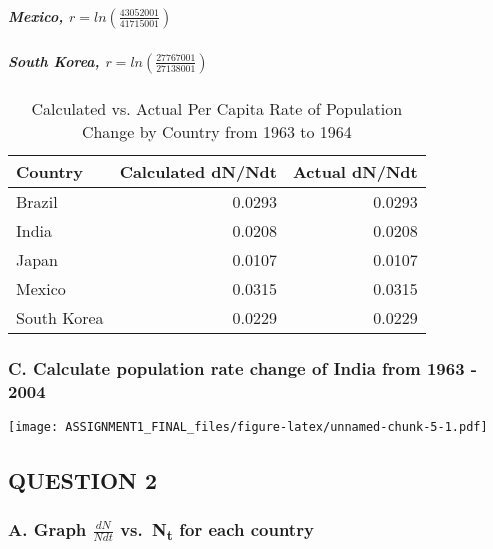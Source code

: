 \documentclass[]{article}
\let\oldsubparagraph\subparagraph
\renewcommand{\subparagraph}[1]{\oldsubparagraph{#1}\mbox{}}
\begin{document}
\subparagraph{\texorpdfstring{Mexico,
\(r= ln\left(\frac{43052001}{41715001}\right)\)}{Mexico, r= ln\textbackslash{}left(\textbackslash{}frac\{43052001\}\{41715001\}\textbackslash{}right)}}\label{mexico-r-lnleftfrac4305200141715001right}

\subparagraph{\texorpdfstring{South Korea,
\(r= ln\left(\frac{27767001}{27138001}\right)\)}{South Korea, r= ln\textbackslash{}left(\textbackslash{}frac\{27767001\}\{27138001\}\textbackslash{}right)}}\label{south-korea-r-lnleftfrac2776700127138001right}

\begin{table}

\caption{\label{tab:unnamed-chunk-4}Calculated vs. Actual Per Capita Rate of Population Change by Country from 1963 to 1964}
\centering
\begin{tabular}[t]{l|r|r}
\hline
Country & Calculated dN/Ndt & Actual dN/Ndt\\
\hline
Brazil & 0.0293 & 0.0293\\
\hline
India & 0.0208 & 0.0208\\
\hline
Japan & 0.0107 & 0.0107\\
\hline
Mexico & 0.0315 & 0.0315\\
\hline
South Korea & 0.0229 & 0.0229\\
\hline
\end{tabular}
\end{table}

\subsubsection{C. Calculate population rate change of India from 1963 -
2004}\label{c.-calculate-population-rate-change-of-india-from-1963---2004}

\texttt{[image: ASSIGNMENT1\_FINAL\_files/figure-latex/unnamed-chunk-5-1.pdf]}

\subsection{QUESTION 2}\label{question-2}

\subsubsection{\texorpdfstring{A. Graph \(\frac{dN}{Ndt}\)
vs.~N\textsubscript{t} for each
country}{A. Graph \textbackslash{}frac\{dN\}\{Ndt\} vs.~Nt for each country}}\label{a.-graph-fracdnndt-vs.nt-for-each-country}
\end{document}
